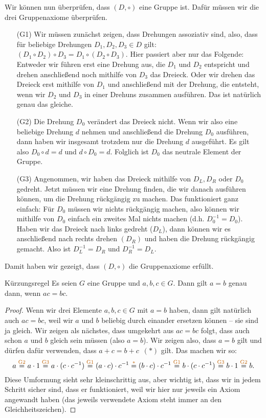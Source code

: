 \documentclass[../../main.tex]{subfiles}
\begin{document}
\begin{advexample}{}
    Wir können nun überprüfen, dass $(D,\circ)$ eine Gruppe ist. Dafür müssen wir die drei Gruppenaxiome überprüfen.
    \begin{enumerate}
        \item[(G1)] Wir müssen zunächst zeigen, dass Drehungen assoziativ sind, also, dass für beliebige Drehungen $D_1,D_2,D_3\in D$ gilt: $(D_1\circ D_2)\circ D_3=D_1\circ (D_2\circ D_3)$. Hier passiert aber nur das Folgende: Entweder wir führen erst eine Drehung aus, die $D_1$ und $D_2$ entspricht und drehen anschließend noch mithilfe von $D_3$ das Dreieck. Oder wir drehen das Dreieck erst mithilfe von $D_1$ und anschließend mit der Drehung, die entsteht, wenn wir $D_2$ und $D_3$ in einer Drehuns zusammen ausführen. Das ist natürlich genau das gleiche.
        \item[(G2)] Die Drehung $D_0$ verändert das Dreieck nicht. Wenn wir also eine beliebige Drehung $d$ nehmen und anschließend die Drehung $D_0$ ausführen, dann haben wir insgesamt trotzdem nur die Drehung $d$ ausgeführt. Es gilt also $D_0\circ d=d$ und $d\circ D_0=d$. Folglich ist $D_0$ das neutrale Element der Gruppe.
        \item[(G3)] Angenommen, wir haben das Dreieck mithilfe von $D_L, D_R$ oder $D_0$ gedreht. Jetzt müssen wir eine Drehung finden, die wir danach ausführen können, um die Drehung rückgängig zu machen. Das funktioniert ganz einfach: Für $D_0$ müssen wir nichts rückgängig machen, also können wir mithilfe von $D_0$ einfach ein zweites Mal nichts machen (d.h. $D_0^{-1}=D_0$). Haben wir das Dreieck nach links gedreht ($D_L$), dann können wir es anschließend nach rechts drehen $(D_R)$ und haben die Drehung rückgängig gemacht. Also ist $D_L^{-1}=D_R$ und $D_R^{-1}=D_L$.
    \end{enumerate}
    Damit haben wir gezeigt, dass $(D,\circ)$ die Gruppenaxiome erfüllt.
\end{advexample}

\begin{theorem}{Kürzungsregel}
    Es seien $G$ eine Gruppe und $a,b,c \in G$. Dann gilt $a=b$ genau dann, wenn $ac=bc$.
\end{theorem}
\begin{proof}
     Wenn wir drei Elemente $a,b,c \in G$ mit $a=b$ haben, dann gilt natürlich auch $ac=bc$, weil wir $a$ und $b$ beliebig durch einander ersetzen können -- sie sind ja gleich. Wir zeigen als nächstes, dass umgekehrt aus $ac=bc$ folgt, dass auch schon $a$ und $b$ gleich sein müssen (also $a=b$). Wir zeigen also, dass $a=b$ gilt und dürfen dafür verwenden, dass \mbox{$a+c=b+c$ \textcolor{orange!75!black}{$(*)$}} gilt. Das machen wir so:
    \[a\axiom{G2}a\cdot 1\axiom{G3}a\cdot(c\cdot c^{-1})\axiom{G1}(a\cdot c)\cdot c^{-1}\axiom{$*$}(b\cdot c)\cdot c^{-1}\axiom{G1}b\cdot (c\cdot c^{-1})\axiom{G3}b\cdot 1\axiom{G2}b.\]
    Diese Umformung sieht sehr kleinschrittig aus, aber wichtig ist, dass wir in jedem Schritt sicher sind, dass er funktioniert, weil wir hier nur jeweils ein Axiom angewandt haben (das jeweils verwendete Axiom steht immer an den Gleichheitszeichen).
    
\end{proof}

\newpage
\pagecolor{white}
\end{document}
